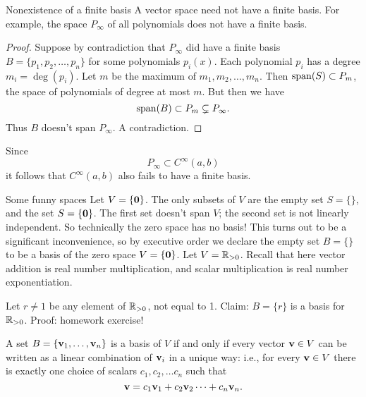 \begin{frame}{Nonexistence of a finite basis}
A vector space need not have a finite basis. 
\bspace
For example, the space $P_\infty$ of all polynomials does not have a finite basis. 
\pause
\begin{proof}
Suppose by contradiction that $P_\infty$ did have a finite basis $B=\{p_1,p_2,\dots, p_n\}$ for some polynomials $p_i(x)$. 
\bpause 
Each polynomial $p_i$ has a degree $m_i=\deg(p_i)$. Let $m$ be the maximum of $m_1,m_2,\dots, m_n$. Then $\operatorname{span}(S)\subset P_m$, the space of polynomials of degree at most $m$. 
\bpause 
But then we have 
\[
\operatorname{span}(B)\subset P_m\subsetneq P_\infty.
\]
Thus $B$ doesn't span $P_\infty$. A contradiction. 
\end{proof}
\pause Since \[ P_\infty\subset C^\infty(a,b)\]
it follows that $C^\infty(a,b)$ also fails to have a finite basis. 
\end{frame}
\begin{frame}{Some funny spaces}
\bb
\ii Let $V=\{{\mathbf 0}\}$. The only subsets of $V$ are the empty set $S=\{ \}$, and the set $S=\{{\mathbf 0}\}$.
\bpause 
The first set doesn't span $V$; the second set is not linearly independent. So technically the zero space has no basis! 
\bpause 
This turns out to be a significant inconvenience, so by executive order we declare the empty set $B=\{ \}$ to be a basis of the zero space $V=\{{\mathbf 0}\}$. 
\pause\ii Let $V={\mathbb R}_{>0}$. Recall that here vector addition is real number multiplication, and scalar multiplication is real number exponentiation. 

Let $r\ne 1$ be any element of ${\mathbb R}_{>0}$, not equal to 1. Claim: $B=\{r\}$ is a basis for ${\mathbb R}_{>0}$.  
\bspace
Proof: homework exercise! 
\ee
\end{frame}
\begin{frame}
\begin{theorem}\label{th:basisunique}
A set $B=\{{\mathbf v}_1,\dots, {\mathbf v}_n\}$ is a basis of $V$ if and only if every vector ${\mathbf v}\in V$ can be written as a linear combination of ${\mathbf v}_i$ in a \alert{unique way}: i.e., for every ${\mathbf v}\in V$ there is exactly one choice of scalars $c_1,c_2, \dots c_n$ such that 
\[
{\mathbf v}=c_1{\mathbf v}_1+c_2{\mathbf v}_2\cdots +c_n{\mathbf v}_n.
\]
\end{theorem}
\pause
\begin{comment}
The theorem allows us to prove a set $B$ is a basis in one shot. No need to prove $\Span(B)=V$ and linear independence in two separate steps. 
\bpause
Indeed, simply set up a linear combination of the given vectors equal to an arbitrary element of $V$, boil this vector equation down to a system of $n$ linear equations in the $n$ unknowns $c
_i$, and use GE to determine the set of solutions. 
\end{comment}
\end{frame}


